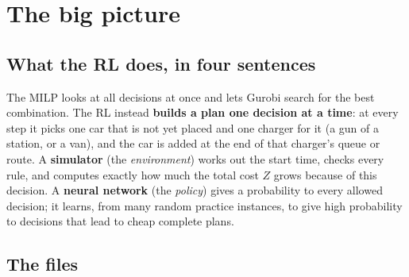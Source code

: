 \section{The big picture}

\subsection{What the RL does, in four sentences}

The MILP looks at all decisions at once and lets Gurobi search for the best combination. The RL instead \textbf{builds a plan one decision at a time}: at every step it picks one car that is not yet placed and one charger for it (a gun of a station, or a van), and the car is added at the end of that charger's queue or route. A \textbf{simulator} (the \emph{environment}) works out the start time, checks every rule, and computes exactly how much the total cost $Z$ grows because of this decision. A \textbf{neural network} (the \emph{policy}) gives a probability to every allowed decision; it learns, from many random practice instances, to give high probability to decisions that lead to cheap complete plans.

\subsection{The files}

